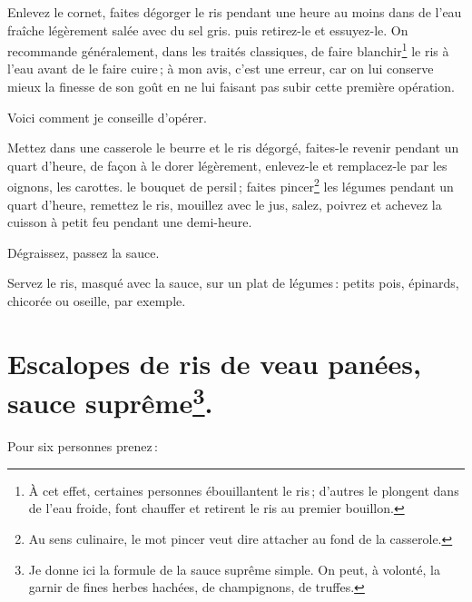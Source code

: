Enlevez le cornet, faites dégorger le ris pendant une heure au moins dans de
l'eau fraîche légèrement salée avec du sel gris. puis retirez-le et essuyez-le.
On recommande généralement, dans les traités classiques, de faire
blanchir\footnote{À cet effet, certaines personnes ébouillantent le ris ;
d'autres le plongent dans de l'eau froide, font chauffer et retirent le ris au
premier bouillon.} le ris à l'eau avant de le faire cuire ; à mon avis, c'est
une erreur, car on lui conserve mieux la finesse de son goût en ne lui faisant
pas subir cette première opération.

Voici comment je conseille d'opérer.

Mettez dans une casserole le beurre et le ris dégorgé, faites-le revenir
pendant un quart d'heure, de façon à le dorer légèrement, enlevez-le et
remplacez-le par les oignons, les carottes. le bouquet de persil ; faites
pincer\footnote{
Au sens culinaire, le mot pincer veut dire attacher au fond de
la casserole.} les légumes pendant un quart d'heure, remettez le ris, mouillez
avec le jus, salez, poivrez et achevez la cuisson à petit feu pendant une
demi-heure.

Dégraissez, passez la sauce.

Servez le ris, masqué avec la sauce, sur un plat de légumes : petits pois, épinards,
chicorée ou oseille, par exemple.

\section*{\centering Escalopes de ris de veau panées, sauce suprême\footnote{Je
donne ici la formule de la sauce suprême simple. On peut, à volonté, la garnir
de fines herbes hachées, de champignons, de truffes.}.}
{}

Pour six personnes prenez :

\medskip

